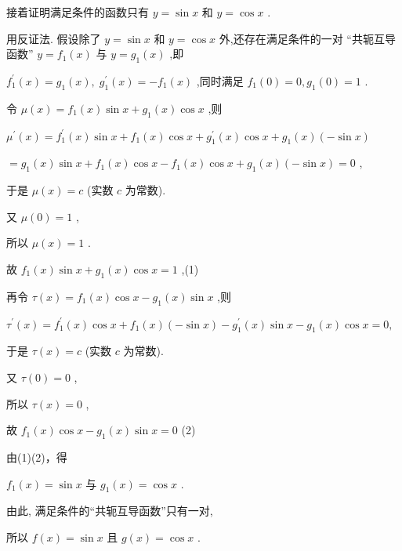 \documentclass[10pt]{article}
\begin{document}
接着证明满足条件的函数只有 \(y = \sin x\) 和 \(y = \cos x\) .

用反证法. 假设除了 \(y = \sin x\) 和 \(y = \cos x\) 外,还存在满足条件的一对 “共轭互导函数” \(y = {f}_{1}\left( x\right)\) 与 \(y = {g}_{1}\left( x\right)\) ,即

\({f}_{1}^{\prime }\left( x\right)  = {g}_{1}\left( x\right) ,\;{g}_{1}^{\prime }\left( x\right)  =  - {f}_{1}\left( x\right)\) ,同时满足 \({f}_{1}\left( 0\right)  = 0,{g}_{1}\left( 0\right)  = 1\) .

令 \(\mu \left( x\right)  = {f}_{1}\left( x\right) \sin x + {g}_{1}\left( x\right) \cos x\) ,则

\({\mu }^{\prime }\left( x\right)  = {f}_{1}^{\prime }\left( x\right) \sin x + {f}_{1}\left( x\right) \cos x + {g}_{1}^{\prime }\left( x\right) \cos x + {g}_{1}\left( x\right) \left( {-\sin x}\right)\)

\(= {g}_{1}\left( x\right) \sin x + {f}_{1}\left( x\right) \cos x - {f}_{1}\left( x\right) \cos x + {g}_{1}\left( x\right) \left( {-\sin x}\right)  = 0\) ,

于是 \(\mu \left( x\right)  = c\) (实数 \(c\) 为常数).

又 \(\mu \left( 0\right)  = 1\) ,

所以 \(\mu \left( x\right)  = 1\) .

故 \({f}_{1}\left( x\right) \sin x + {g}_{1}\left( x\right) \cos x = 1\) ,(1)

再令 \(\tau \left( x\right)  = {f}_{1}\left( x\right) \cos x - {g}_{1}\left( x\right) \sin x\) ,则

\({\tau }^{\prime }\left( x\right)  = {f}_{1}^{\prime }\left( x\right) \cos x + {f}_{1}\left( x\right) \left( {-\sin x}\right)  - {g}_{1}^{\prime }\left( x\right) \sin x - {g}_{1}\left( x\right) \cos x = 0,\)

于是 \(\tau \left( x\right)  = c\) (实数 \(c\) 为常数).

又 \(\tau \left( 0\right)  = 0\) ,

所以 \(\tau \left( x\right)  = 0\) ,

故 \({f}_{1}\left( x\right) \cos x - {g}_{1}\left( x\right) \sin x = 0\) (2)

由(1)(2)，得

\({f}_{1}\left( x\right)  = \sin x\) 与 \({g}_{1}\left( x\right)  = \cos x\) .

由此, 满足条件的“共轭互导函数”只有一对,

所以 \(f\left( x\right)  = \sin x\) 且 \(g\left( x\right)  = \cos x\) .
\end{document}
